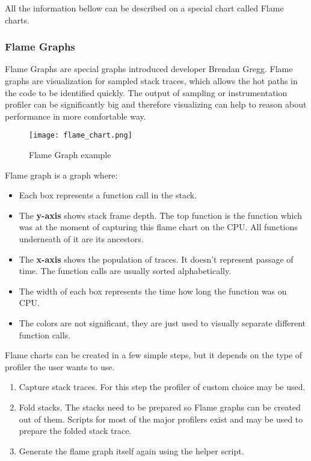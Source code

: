 All the information bellow can be described on a special chart called Flame charts.
\subsubsection{Flame Graphs}
Flame Graphs are special graphs introduced developer Brendan Gregg. Flame graphs are visualization for sampled stack traces, which allows the hot paths in the code to be identified quickly. The output of sampling or instrumentation profiler can be significantly big and therefore visualizing can help to reason about performance in more comfortable way. 

\begin{figure}
	\centering
	\texttt{[image: flame\_chart.png]}
	\caption{Flame Graph example}
	\label{fig:flame_chart}
\end{figure}
Flame graph is a graph where:
\begin{itemize}
	\item Each box represents a function call in the stack.
	\item The \textbf{y-axis} shows stack frame depth. The top function is the function which was at the moment of capturing this flame chart on the CPU. All functions underneath of it are its ancestors.
	\item The \textbf{x-axis} shows the population of traces. It doesn't represent passage of time. The function calls are usually sorted alphabetically.
	\item The width of each box represents the time how long the function was on CPU.
	\item The colors are not significant, they are just used to visually separate different function calls.
\end{itemize}

Flame charts can be created in a few simple steps, but it depends on the type of profiler the user wants to use. 
\begin{enumerate}
	\item Capture stack traces. For this step the profiler of custom choice may be used.
	\item Fold stacks. The stacks need to be prepared so Flame graphs can be created out of them. Scripts for most of the major profilers exist and may be used to prepare the folded stack trace.
	\item Generate the flame graph itself again using the helper script.
\end{enumerate}

